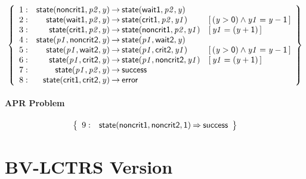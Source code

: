 \documentclass[a4paper]{article}
\newcommand{\symb}[1]{\mathsf{#1}}
\newcommand{\var}[1]{\mathit{#1}}
\newcommand{\Constraint}[1]{[\, #1 \,]}
\begin{document}
\[
\left\{
\begin{array}{rr@{\>}c@{\>}ll}
\mathrm{1} : 
 & \symb{state}(\symb{noncrit1},\var{p2},\var{y})
 & \to 
 & \symb{state}(\symb{wait1},\var{p2},\var{y})\\

\mathrm{2} : 
 & \symb{state}(\symb{wait1},\var{p2},\var{y})
 & \to 
 & \symb{state}(\symb{crit1},\var{p2},\var{y1})
 & \Constraint{(\var{y} > \symb{0}) \land \var{y1} = \var{y} - \symb{1}}\\

\mathrm{3} : 
 & \symb{state}(\symb{crit1},\var{p2},\var{y})
 & \to 
 & \symb{state}(\symb{noncrit1},\var{p2},\var{y1})
 & \Constraint{\var{y1} = (\var{y} + \symb{1})}\\

\mathrm{4} : 
 & \symb{state}(\var{p1},\symb{noncrit2},\var{y})
 & \to 
 & \symb{state}(\var{p1},\symb{wait2},\var{y})\\

\mathrm{5} : 
 & \symb{state}(\var{p1},\symb{wait2},\var{y})
 & \to 
 & \symb{state}(\var{p1},\symb{crit2},\var{y1})
 & \Constraint{(\var{y} > \symb{0}) \land \var{y1} = \var{y} - \symb{1}}\\

\mathrm{6} : 
 & \symb{state}(\var{p1},\symb{crit2},\var{y})
 & \to 
 & \symb{state}(\var{p1},\symb{noncrit2},\var{y1})
 & \Constraint{\var{y1} = (\var{y} + \symb{1})}\\

\mathrm{7} : 
 & \symb{state}(\var{p1},\var{p2},\var{y})
 & \to 
 & \symb{success}\\

\mathrm{8} : 
 & \symb{state}(\symb{crit1},\symb{crit2},\var{y})
 & \to 
 & \symb{error}\\

\end{array}
\right\}
\]


\paragraph{APR Problem}

\[
\left\{
\begin{array}{rr@{\>}c@{\>}ll}
\mathrm{9} : 
 & \symb{state}(\symb{noncrit1},\symb{noncrit2},\symb{1})
 & \Rightarrow 
 & \symb{success}\\

\end{array}
\right\}
\]

\newpage
\section*{BV-LCTRS Version}
\end{document}
